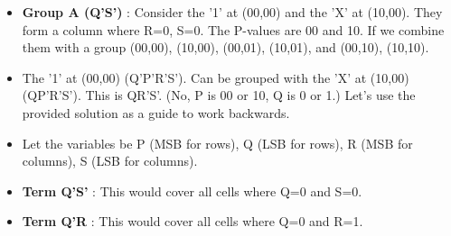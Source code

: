 \documentclass{article}
\begin{document}
\begin{itemize}
\begin{enumerate}
\begin{itemize}
\begin{tabular}{|c|c|c|c|c|}
\end{tabular}

            \item \textbf{Group A (Q'S')} : Consider the '1' at (00,00) and the 'X' at (10,00). They form a column where R=0, S=0. The P-values are 00 and 10. If we combine them with a group (00,00), (10,00), (00,01), (10,01), and (00,10), (10,10).
                \item The '1' at (00,00) (Q'P'R'S'). Can be grouped with the 'X' at (10,00) (QP'R'S'). This is QR'S'. (No, P is 00 or 10, Q is 0 or 1.) Let's use the provided solution as a guide to work backwards.
            \item Let the variables be P (MSB for rows), Q (LSB for rows), R (MSB for columns), S (LSB for columns).
                \item \textbf{Term Q'S'} : This would cover all cells where Q=0 and S=0.
            \item \textbf{Term Q'R} : This would cover all cells where Q=0 and R=1.
\end{itemize}
\end{enumerate}
\end{itemize}
\end{document}
